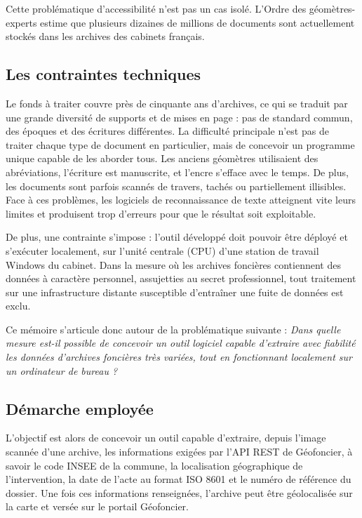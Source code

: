 Cette problématique d'accessibilité n'est pas un cas isolé. L'Ordre des géomètres-experts estime que plusieurs dizaines de millions de documents sont actuellement stockés dans les archives des cabinets français.

\subsection{Les contraintes techniques}

Le fonds à traiter couvre près de cinquante ans d'archives, ce qui se traduit par une grande diversité de supports et de mises en page : pas de standard commun, des époques et des écritures différentes. La difficulté principale n'est pas de traiter chaque type de document en particulier, mais de concevoir un programme unique capable de les aborder tous. Les anciens géomètres utilisaient des abréviations, l'écriture est manuscrite, et l'encre s'efface avec le temps. De plus, les documents sont parfois scannés de travers, tachés ou partiellement illisibles. Face à ces problèmes, les logiciels de reconnaissance de texte atteignent vite leurs limites et produisent trop d'erreurs pour que le résultat soit exploitable.

De plus, une contrainte s'impose : l'outil développé doit pouvoir être déployé et s'exécuter localement, sur l'unité centrale (CPU) d'une station de travail Windows du cabinet. Dans la mesure où les archives foncières contiennent des données à caractère personnel, assujetties au secret professionnel, tout traitement sur une infrastructure distante susceptible d'entraîner une fuite de données est exclu.

Ce mémoire s'articule donc autour de la problématique suivante : \textit{Dans quelle mesure est-il possible de concevoir un outil logiciel capable d'extraire avec fiabilité les données d'archives foncières très variées, tout en fonctionnant localement sur un ordinateur de bureau ?}

\subsection{Démarche employée}

L'objectif est alors de concevoir un outil capable d'extraire, depuis l'image scannée d'une archive, les informations exigées par l'API REST de Géofoncier, à savoir le code INSEE de la commune, la localisation géographique de l'intervention, la date de l'acte au format ISO 8601 et le numéro de référence du dossier. Une fois ces informations renseignées, l'archive peut être géolocalisée sur la carte et versée sur le portail Géofoncier.

